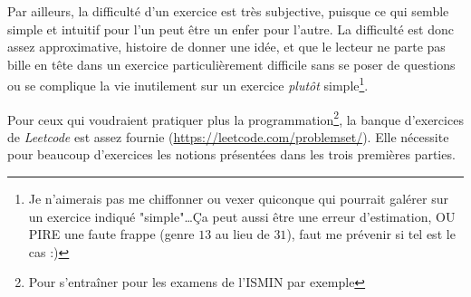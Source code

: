 \documentclass[../main.tex]{subfiles}
\begin{document}
Par ailleurs, la difficulté d'un exercice est très subjective, puisque ce qui semble simple et intuitif pour l'un peut être un enfer pour l'autre. La difficulté est donc assez approximative, histoire de donner une idée, et que le lecteur ne parte pas bille en tête dans un exercice particulièrement difficile sans se poser de questions ou se complique la vie inutilement sur un exercice \textit{plutôt} simple\footnote{Je n'aimerais pas me chiffonner ou vexer quiconque qui pourrait galérer sur un exercice indiqué "simple"\dots Ça peut aussi être une erreur d'estimation, OU PIRE une faute frappe (genre $13$ au lieu de $31$), faut me prévenir si tel est le cas :)}.

Pour ceux qui voudraient pratiquer plus la programmation\footnote{Pour s'entraîner pour les examens de l'ISMIN par exemple}, la banque d'exercices de \textit{Leetcode} est assez fournie (\url{https://leetcode.com/problemset/}). Elle nécessite pour beaucoup d'exercices les notions présentées dans les trois premières parties.
\newpage
\end{document}
